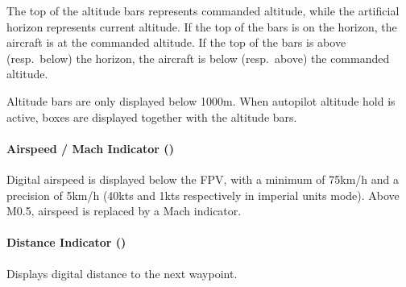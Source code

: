 The top of the altitude bars represents commanded altitude,
while the artificial horizon represents current altitude.
If the top of the bars is on the horizon, the aircraft is at the commanded altitude.
If the top of the bars is above (resp.\ below) the horizon,
the aircraft is below (resp.\ above) the commanded altitude.

Altitude bars are only displayed below 1000m.
When autopilot altitude hold is active, boxes are displayed together with the altitude bars.

\paragraph{Airspeed / Mach Indicator ()}
Digital airspeed is displayed below the FPV,
with a minimum of 75km/h and a precision of 5km/h
(40kts and 1kts respectively in imperial units mode).
Above M0.5, airspeed is replaced by a Mach indicator.

\paragraph{Distance Indicator ()}
Displays digital distance to the next waypoint.
